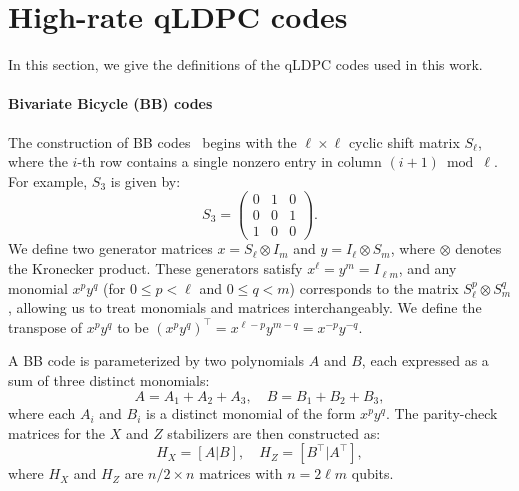 \section{High-rate qLDPC codes}
\label{app:high-rate-qLDPC-codes}

In this section, we give the definitions of the qLDPC codes used in this work.

\paragraph{Bivariate Bicycle (BB) codes}
The construction of BB codes~\cite{bravyi_high-threshold_2024,yoder_tour_2025} begins with the $\ell\times\ell$ cyclic shift matrix $S_\ell$, where the $i$-th row contains a single nonzero entry in column $(i+1) \bmod \ell$.
For example, $S_3$ is given by:
\begin{equation}
    S_3 = \begin{pmatrix}
        0 & 1 & 0 \\
        0 & 0 & 1 \\
        1 & 0 & 0
    \end{pmatrix}.
\end{equation}
We define two generator matrices $x = S_\ell \otimes I_m$ and $y = I_\ell \otimes S_m$, where $\otimes$ denotes the Kronecker product.
These generators satisfy $x^{\ell} = y^{m} = I_{\ell m}$, and any monomial $x^p y^q$ (for $0 \leq p < \ell$ and $0 \leq q < m$) corresponds to the matrix $S_\ell^p \otimes S_m^q$, allowing us to treat monomials and matrices interchangeably.
We define the transpose of $x^p y^q$ to be $(x^p y^q)^\top = x^{\ell -p} y^{m - q} = x^{-p} y^{-q}$.

A BB code is parameterized by two polynomials $A$ and $B$, each expressed as a sum of three distinct monomials:
\begin{equation}
    A = A_1 + A_2 + A_3, \quad B = B_1 + B_2 + B_3,
\end{equation}
where each $A_i$ and $B_i$ is a distinct monomial of the form $x^p y^q$.
The parity-check matrices for the $X$ and $Z$ stabilizers are then constructed as:
\begin{equation}
H_X = [A|B], \quad H_Z = [B^\top|A^\top],
\end{equation}
where $H_X$ and $H_Z$ are $n/2 \times n$ matrices with $n = 2 \ell m$ qubits.

